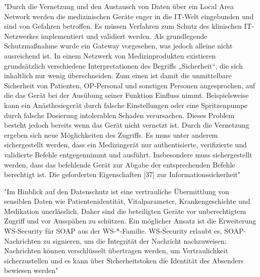 	"Durch die Vernetzung und den Austausch von Daten über ein Local Area Network
	werden die medizinischen Geräte enger in die IT-Welt eingebunden und sind von
	Gefahren betroffen. Es müssen Verfahren zum Schutz des klinischen IT-Netzwerkes
	implementiert und validiert werden. Als grundlegende Schutzmaßnahme wurde ein
	Gateway vorgesehen, was jedoch alleine nicht ausreichend ist. In einem Netzwerk von
	Medizinprodukten existieren grundsätzlich verschiedene Interpretationen des Begriffs
	„Sicherheit“, die sich inhaltlich nur wenig überschneiden. Zum einen ist damit die
	unmittelbare Sicherheit von Patienten, OP-Personal und sonstigen Personen angesprochen,
	auf die das Gerät bei der Ausübung seiner Funktion Einfluss nimmt. Beispielsweise
	kann ein Anästhesiegerät durch falsche Einstellungen oder eine Spritzenpumpe
	durch falsche Dosierung intolerablen Schaden verursachen. Dieses Problem besteht
	jedoch bereits wenn das Gerät nicht vernetzt ist. Durch die Vernetzung ergeben sich
	neue Möglichkeiten des Zugriffs. Es muss unter anderem sichergestellt werden, dass
	ein Medizingerät nur authentisierte, verifizierte und validierte Befehle entgegennimmt
	und ausführt. Insbesondere muss sichergestellt werden, dass das befehlende Gerät zur
	Abgabe der entsprechenden Befehle berechtigt ist.
	Die geforderten Eigenschaften [37] zur Informationssicherheit"
	
	"Im Hinblick auf den Datenschutz ist eine vertrauliche
	Übermittlung von sensiblen Daten wie Patientenidentität, Vitalparameter,
	Krankengeschichte und Medikation unerlässlich. Daher sind die beteiligten Geräte
	vor unberechtigtem Zugriff und vor Ausspähen zu schützen. Ein möglicher Ansatz ist
	die Erweiterung WS-Security für SOAP aus der WS-*-Familie. WS-Security erlaubt es,
	SOAP-Nachrichten zu signieren, um die Integrität der Nachricht nachzuweisen; Nachrichten
	können verschlüsselt übertragen werden, um Vertraulichkeit sicherzustellen
	und es kann über Sicherheitstoken die Identität des Absenders bewiesen werden"